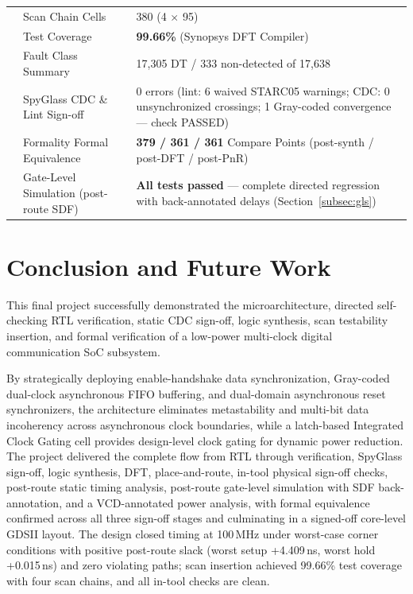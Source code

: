 \documentclass[11pt,a4paper]{article}
\begin{document}
\begin{table}[htbp]
\begin{tabularx}{\textwidth}{|>{\raggedright\arraybackslash}p{3.9cm}|>{\raggedright\arraybackslash}p{5.6cm}|Y|}
\hline
{}
 & Scan Chain Cells & 380 (4 $\times$ 95) \\ 
 & Test Coverage & \textbf{99.66\%} (Synopsys DFT Compiler) \\ 
 & Fault Class Summary & 17,305 DT / 333 non-detected of 17,638 \\
\hline
{}
 & SpyGlass CDC \& Lint Sign-off & 0 errors (lint: 6 waived STARC05 warnings; CDC: 0 unsynchronized crossings; 1 Gray-coded convergence --- check PASSED) \\ 
 & Formality Formal Equivalence & \textbf{379 / 361 / 361} Compare Points (post-synth / post-DFT / post-PnR) \\ 
 & Gate-Level Simulation (post-route SDF) & \textbf{All tests passed} --- complete directed regression with back-annotated delays (Section~\ref{subsec:gls}) \\
\hline
\end{tabularx}
\end{table}

\section{Conclusion and Future Work}\label{sec:conclusion}

This final project successfully demonstrated the microarchitecture, directed self-checking RTL verification, static CDC sign-off, logic synthesis, scan testability insertion, and formal verification of a low-power multi-clock digital communication SoC subsystem.

By strategically deploying enable-handshake data synchronization, Gray-coded dual-clock asynchronous FIFO buffering, and dual-domain asynchronous reset synchronizers, the architecture eliminates metastability and multi-bit data incoherency across asynchronous clock boundaries, while a latch-based Integrated Clock Gating cell provides design-level clock gating for dynamic power reduction. The project delivered the complete flow from RTL through verification, SpyGlass sign-off, logic synthesis, DFT, place-and-route, in-tool physical sign-off checks, post-route static timing analysis, post-route gate-level simulation with SDF back-annotation, and a VCD-annotated power analysis, with formal equivalence confirmed across all three sign-off stages and culminating in a signed-off core-level GDSII layout. The design closed timing at 100\,MHz under worst-case corner conditions with positive post-route slack (worst setup +4.409\,ns, worst hold +0.015\,ns) and zero violating paths; scan insertion achieved 99.66\% test coverage with four scan chains, and all in-tool checks are clean.
\end{document}

